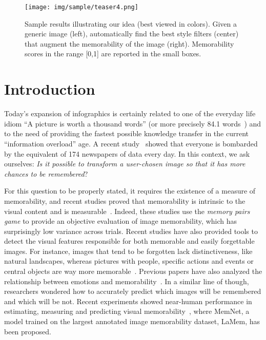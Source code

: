 \documentclass{sig-alternate-05-2015}
\begin{document}
\printccsdesc




\begin{figure}[t]
\texttt{[image: img/sample/teaser4.png]}
\vspace{-0.7cm}
\caption{Sample results illustrating our idea (best viewed in colors). Given a generic image (left), automatically find the best style filters (center) that augment the memorability of the image (right). Memorability scores in the range [0,1] are reported in the small boxes.}
\label{fig:teaser}
\vspace{-0.3cm}
\end{figure}

\vspace{1.0cm}
\section{Introduction}

Today's expansion of infographics is certainly related to one of the everyday life idiom ``A picture is worth a thousand words'' (or more precisely 84.1 words~\cite{blackwell1997correction}) and to the need of providing the fastest possible knowledge transfer in the current ``information overload'' age. A recent study~\cite{hilbert2012much} showed that everyone is bombarded by the equivalent of 174 newspapers of data every day. In this context, we ask ourselves: \emph{Is it possible to transform a user-chosen image so that it has more chances to be remembered}?


For this question to be properly stated, it requires the existence of a measure of memorability, and recent studies proved that memorability is intrinsic to the visual content and is measurable~\cite{isola2011what,isola2014what}. Indeed, these studies use the \textit{memory pairs game} to provide an objective evaluation of image memorability, which has surprisingly low variance across trials.
Recent studies have also provided tools to detect the visual features responsible for both memorable and easily forgettable images. For instance, images that tend to be forgotten lack distinctiveness, like natural landscapes, whereas pictures with people, specific actions and events or central objects are way more memorable~\cite{brady2008visual}. 
Previous papers have also analyzed the relationship between emotions and memorability~\cite{cahill1995novel}. 
In a similar line of though, researchers wondered how to accurately predict which images will be remembered and which will be not. Recent experiments showed near-human performance in estimating, measuring and predicting visual memorability~\cite{khosla2015understanding}, where MemNet, a model trained on the largest annotated image memorability dataset, LaMem, has been proposed.
\end{document}
